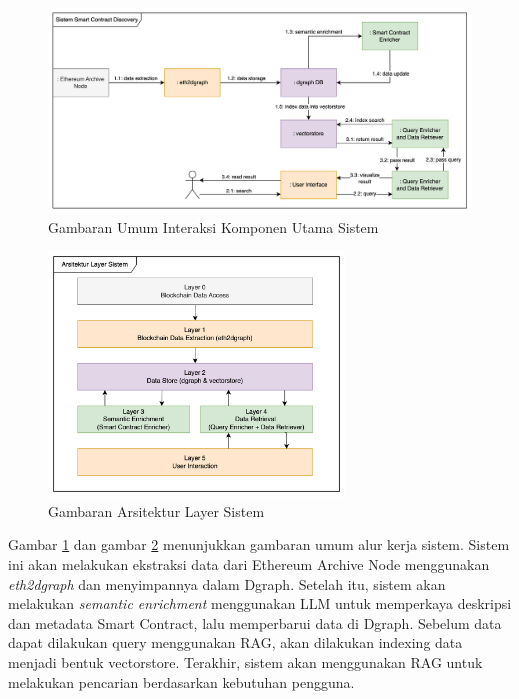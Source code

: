 \begin{figure}[ht]
	\centering
	\includegraphics[width=1\textwidth]{resources/chapter-3/komponen-utama-new.png}
	\caption{Gambaran Umum Interaksi Komponen Utama Sistem}
	\label{image:komponen-sistem}
\end{figure}

\begin{figure}[ht]
	\centering
	\includegraphics[width=0.7\textwidth]{resources/chapter-3/layer-arsitektur-new.png}
	\caption{Gambaran Arsitektur Layer Sistem}
	\label{image:layer-arsitektur}
\end{figure}


Gambar \ref{image:komponen-sistem} dan gambar \ref{image:layer-arsitektur} menunjukkan gambaran umum alur kerja sistem. Sistem ini akan melakukan ekstraksi data dari Ethereum Archive Node menggunakan \textit{eth2dgraph} dan menyimpannya dalam Dgraph. Setelah itu, sistem akan melakukan \textit{semantic enrichment} menggunakan LLM untuk memperkaya deskripsi dan metadata Smart Contract, lalu memperbarui data di Dgraph. Sebelum data dapat dilakukan query menggunakan RAG, akan dilakukan indexing data menjadi bentuk vectorstore. Terakhir, sistem akan menggunakan RAG untuk melakukan pencarian berdasarkan kebutuhan pengguna. 

